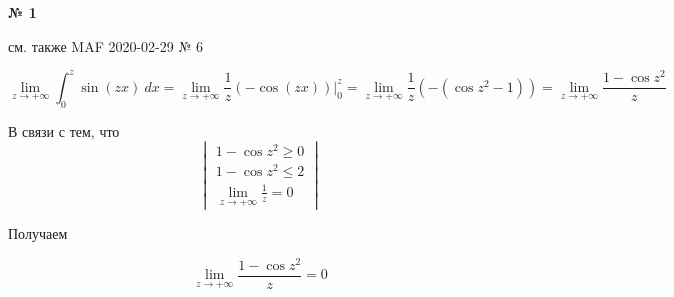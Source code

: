 \documentclass{article}
\begin{document}
\textbf{№ 1} 
\large

см. также MAF 2020-02-29 № 6

$$ \lim\limits_{z \to +\infty} \int_{0}^{z} \sin{(zx)} \ dx
= \lim\limits_{z \to +\infty} \frac{1}{z} \left( -\cos{(zx)} \right) \bigg\vert_{0}^{z}
= \lim\limits_{z \to +\infty} \frac{1}{z} \left( -(\cos{z^2} - 1) \right) 
= \lim\limits_{z \to +\infty} \frac{1 - \cos{z^2}}{z} $$  

В связи с тем, что
$$ \begin{vmatrix}
        1 - \cos{z^2} \geq 0 \\
        1 - \cos{z^2} \leq 2 \\
        \lim\limits_{z \to +\infty} \frac{1}{z} = 0 
   \end{vmatrix} $$

Получаем

$$ \lim\limits_{z \to +\infty} \frac{1 - \cos{z^2}}{z}
= 0 $$
\end{document}
